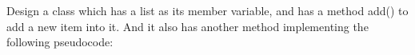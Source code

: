 \documentclass[aspectratio=169, 14pt]{beamer}
\begin{document}
\begin{frame}[fragile]
	Design a class which has a list as its member variable, and has a method \alert{add()} to add a new item into it. And it also has another method implementing the following pseudocode:


\end{frame}
\end{document}
